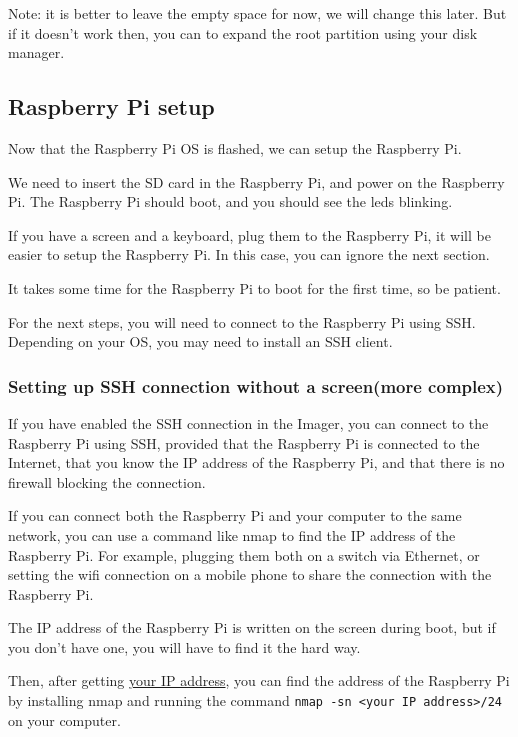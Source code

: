 \documentclass{article}
\begin{document}
Note: it is better to leave the empty space for now, we will change this later. But if it doesn't
work then, you can to expand the root partition using your disk manager.

\subsection{Raspberry Pi setup}

Now that the Raspberry Pi OS is flashed, we can setup the Raspberry Pi.

We need to insert the SD card in the Raspberry Pi, and power on the Raspberry Pi.
The Raspberry Pi should boot, and you should see the leds blinking.

If you have a screen and a keyboard, plug them to the Raspberry Pi, it will be easier to setup the
Raspberry Pi. In this case, you can ignore the next section.

It takes some time for the Raspberry Pi to boot for the first time, so be patient.

For the next steps, you will need to connect to the Raspberry Pi using SSH. Depending on your OS,
you may need to install an SSH client.

\subsubsection{Setting up SSH connection without a screen(more complex)}

If you have enabled the SSH connection in the Imager, you can connect to the Raspberry Pi using
SSH, provided that the Raspberry Pi is connected to the Internet, that you know the IP address of
the Raspberry Pi, and that there is no firewall blocking the connection.

If you can connect both the Raspberry Pi and your computer to the same network, you can use a
command like nmap to find the IP address of the Raspberry Pi.
For example, plugging them both on a switch via Ethernet, or setting the wifi connection on a
mobile phone to share the connection with the Raspberry Pi.

The IP address of the Raspberry Pi is written on the screen during boot, but if you don't have one,
you will have to find it the hard way.

Then, after getting \href{https://www.whatismyip.com/}{your IP address}, you can find the address
of the Raspberry Pi by installing nmap and running the command
\texttt{nmap -sn <your IP address>/24} on your computer.
\end{document}
